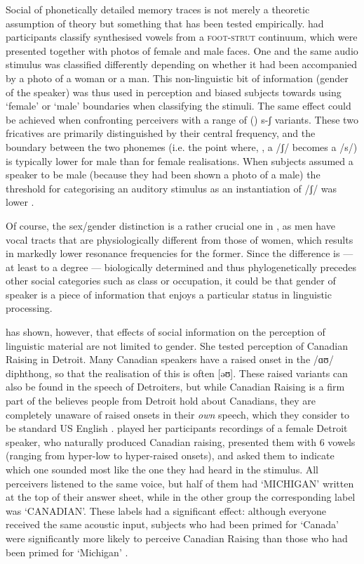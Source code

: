 Social  of phonetically detailed memory traces is not merely a theoretic assumption of  theory but something that has been tested empirically.
\textcite{strandjohnson1996} had participants classify synthesised vowels from a \textsc{foot}-\textsc{strut} continuum, which were presented together with photos of female and male faces.
One and the same audio stimulus was classified differently depending on whether it had been accompanied by a photo of a woman or a man.
This non-linguistic bit of information (gender of the speaker) was thus used in perception and biased subjects towards using `female' or `male'  boundaries when classifying the stimuli.
The same effect could be achieved when confronting perceivers with a range of () s-ʃ variants.
These two fricatives are primarily distinguished by their central frequency, and the boundary between the two phonemes (i.e. the point where, , a /ʃ/ becomes a /s/) is typically lower for male than for female realisations.
When subjects assumed a speaker to be male (because they had been shown a photo of a male) the threshold for categorising an auditory stimulus as an instantiation of /ʃ/ was lower \parencite[cf.][]{strandjohnson1996,strand1999}.

Of course, the sex/gender distinction is a rather crucial one in , as men have vocal tracts that are physiologically different from those of women, which results in markedly lower resonance frequencies for the former.
Since the difference is --- at least to a degree --- biologically determined and thus phylogenetically precedes other social categories such as class or occupation, it could be that gender of speaker is a piece of information that enjoys a particular status in linguistic processing.

\textcite{niedzielski1999} has shown, however, that effects of social information on the perception of linguistic material are not limited to gender.
She tested perception of Canadian Raising in Detroit.
Many Canadian speakers have a raised onset in the /ɑʊ/ diphthong, so that the realisation of this  is often [əʊ].
These raised variants can also be found in the speech of Detroiters, but while Canadian Raising is a firm part of the  believes people from Detroit hold about Canadians, they are completely unaware of raised onsets in their \emph{own} speech, which they consider to be standard US English \parencite[cf.][63]{niedzielski1999}.
\citeauthor{niedzielski1999} played her participants recordings of a female Detroit speaker, who naturally produced Canadian raising, presented them with 6  vowels (ranging from hyper-low to hyper-raised onsets), and asked them to indicate which one sounded most like the one they had heard in the stimulus.
All perceivers listened to the same voice, but half of them had `MICHIGAN' written at the top of their answer sheet, while in the other group the corresponding label was `CANADIAN'.
These labels had a significant effect: although everyone received the same acoustic input, subjects who had been primed for `Canada' were significantly more likely to perceive Canadian Raising than those who had been primed for `Michigan' \parencite[cf.][64--68]{niedzielski1999}.

